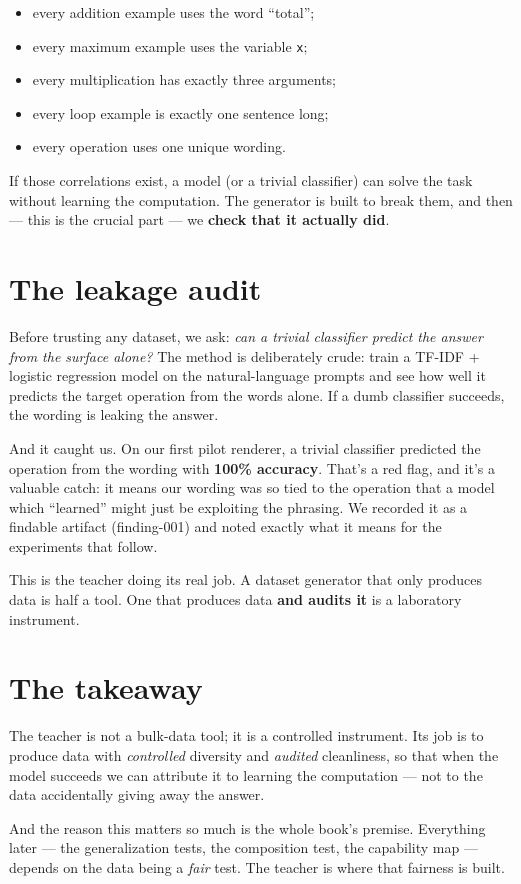 \begin{itemize}
\tightlist
\item
  every addition example uses the word ``total'';
\item
  every maximum example uses the variable \texttt{x};
\item
  every multiplication has exactly three arguments;
\item
  every loop example is exactly one sentence long;
\item
  every operation uses one unique wording.
\end{itemize}

If those correlations exist, a model (or a trivial classifier) can solve
the task without learning the computation. The generator is built to
break them, and then --- this is the crucial part --- we \textbf{check
that it actually did}.

\section{The leakage audit}\label{the-leakage-audit}

Before trusting any dataset, we ask: \emph{can a trivial classifier
predict the answer from the surface alone?} The method is deliberately
crude: train a TF-IDF + logistic regression model on the
natural-language prompts and see how well it predicts the target
operation from the words alone. If a dumb classifier succeeds, the
wording is leaking the answer.

And it caught us. On our first pilot renderer, a trivial classifier
predicted the operation from the wording with \textbf{100\% accuracy}.
That's a red flag, and it's a valuable catch: it means our wording was
so tied to the operation that a model which ``learned'' might just be
exploiting the phrasing. We recorded it as a findable artifact
(finding-001) and noted exactly what it means for the experiments that
follow.

This is the teacher doing its real job. A dataset generator that only
produces data is half a tool. One that produces data \textbf{and audits
it} is a laboratory instrument.

\section{The takeaway}\label{the-takeaway}

The teacher is not a bulk-data tool; it is a controlled instrument. Its
job is to produce data with \emph{controlled} diversity and
\emph{audited} cleanliness, so that when the model succeeds we can
attribute it to learning the computation --- not to the data
accidentally giving away the answer.

And the reason this matters so much is the whole book's premise.
Everything later --- the generalization tests, the composition test, the
capability map --- depends on the data being a \emph{fair} test. The
teacher is where that fairness is built.
